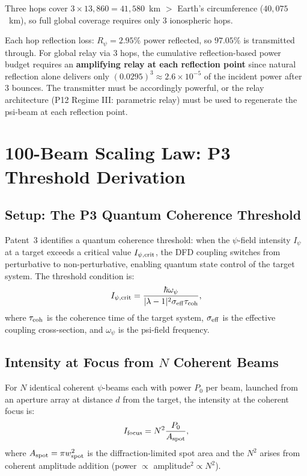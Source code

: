 \documentclass[aps,prd,twocolumn,superscriptaddress]{revtex4-2}
\begin{document}
Three hops cover $3 \times 13{,}860 = 41{,}580$~km $>$ Earth's
circumference ($40{,}075$~km), so full global coverage requires
only 3 ionospheric hops.

Each hop reflection loss: $R_\psi = 2.95\%$ power reflected, so
$97.05\%$ is transmitted through.  For global relay via 3 hops, the
cumulative reflection-based power budget requires an \textbf{amplifying
relay at each reflection point} since natural reflection alone delivers
only $(0.0295)^3 \approx 2.6\times10^{-5}$ of the incident power
after 3 bounces.  The transmitter must be accordingly powerful, or
the relay architecture (P12 Regime III: parametric relay) must be
used to regenerate the psi-beam at each reflection point.

\section{100-Beam Scaling Law: P3 Threshold Derivation}
\label{sec:beam-scaling}

\subsection{Setup: The P3 Quantum Coherence Threshold}

Patent~3 identifies a quantum coherence threshold: when the $\psi$-field
intensity $I_\psi$ at a target exceeds a critical value
$I_{\psi,\rm crit}$, the DFD coupling switches from perturbative
to non-perturbative, enabling quantum state control of the target
system.  The threshold condition is:
\begin{equation}
I_{\psi,\rm crit} = \frac{\hbar\omega_\psi}{|\lambda-1|^2 \sigma_{\rm eff} \tau_{\rm coh}},
\label{eq:P3-thresh}
\end{equation}
where $\tau_{\rm coh}$ is the coherence time of the target system,
$\sigma_{\rm eff}$ is the effective coupling cross-section, and
$\omega_\psi$ is the psi-field frequency.

\subsection{Intensity at Focus from $N$ Coherent Beams}

For $N$ identical coherent $\psi$-beams each with power $P_0$ per
beam, launched from an aperture array at distance $d$ from the target,
the intensity at the coherent focus is:
\begin{equation}
I_{\rm focus} = N^2 \frac{P_0}{A_{\rm spot}},
\label{eq:I-focus}
\end{equation}
where $A_{\rm spot} = \pi w_{\rm spot}^2$ is the diffraction-limited
spot area and the $N^2$ arises from coherent amplitude addition
(power $\propto$ amplitude$^2 \propto N^2$).
\end{document}
